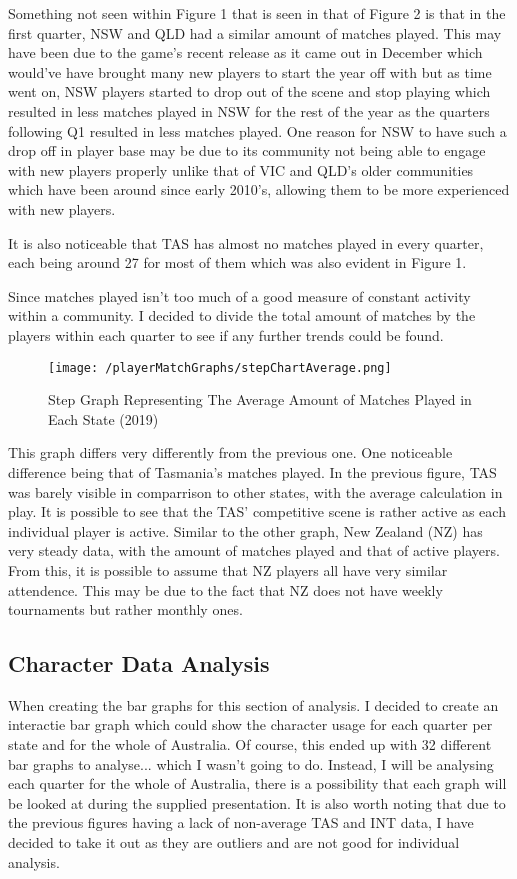 \documentclass[11pt, oneside, a4paper]{article}
\begin{document}
Something not seen within Figure 1 that is seen in that of Figure 2 is that in the first quarter, NSW and QLD had a similar amount of matches played. This may have been due to the game's recent release as it came out in December which would've have brought many new players to start the year off with but as time went on, NSW players started to drop out of the scene and stop playing which resulted in less matches played in NSW for the rest of the year as the quarters following Q1 resulted in less matches played. One reason for NSW to have such a drop off in player base may be due to its community not being able to engage with new players properly unlike that of VIC and QLD's older communities which have been around since early 2010's, allowing them to be more experienced with new players.

It is also noticeable that TAS has almost no matches played in every quarter, each being around 27 for most of them which was also evident in Figure 1.

Since matches played isn't too much of a good measure of constant activity within a community. I decided to divide the total amount of matches by the players within each quarter to see if any further trends could be found.

\newpage
\begin{figure}[!ht]
	\centerline{\texttt{[image: /playerMatchGraphs/stepChartAverage.png]}}
	\caption{Step Graph Representing The Average Amount of Matches Played in Each State (2019)}
	\label{fig:figure2}
\end{figure}

This graph differs very differently from the previous one. One noticeable difference being that of Tasmania's matches played. In the previous figure, TAS was barely visible in comparrison to other states, with the average calculation in play. It is possible to see that the TAS' competitive scene is rather active as each individual player is active. Similar to the other graph, New Zealand (NZ) has very steady data, with the amount of matches played and that of active players. From this, it is possible to assume that NZ players all have very similar attendence. This may be due to the fact that NZ does not have weekly tournaments but rather monthly ones.
\newpage
\subsection{Character Data Analysis}
When creating the bar graphs for this section of analysis. I decided to create an interactie bar graph which could show the character usage for each quarter per state and for the whole of Australia. Of course, this ended up with 32 different bar graphs to analyse... which I wasn't going to do. Instead, I will be analysing each quarter for the whole of Australia, there is a possibility that each graph will be looked at during the supplied presentation. It is also worth noting that due to the previous figures having a lack of non-average TAS and INT data, I have decided to take it out as they are outliers and are not good for individual analysis.
\end{document}
